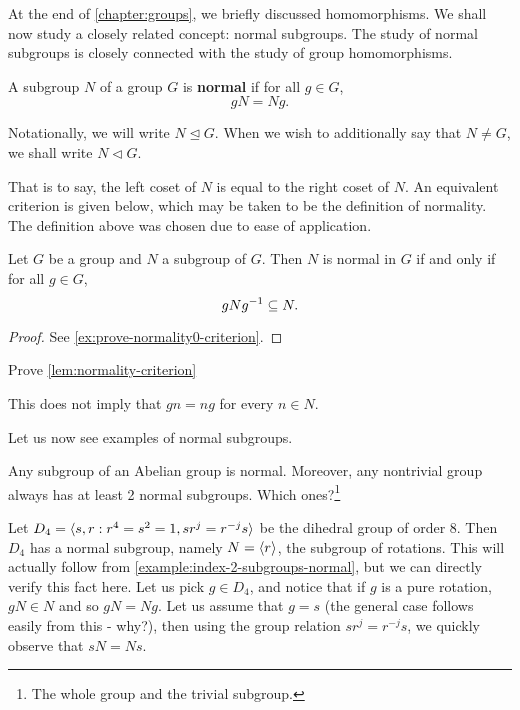 \documentclass[./main.tex]{subfiles}
\begin{document}
At the end of \cref{chapter:groups}, we briefly discussed homomorphisms. We
shall now study a closely related concept: normal subgroups. The study of normal
subgroups is closely connected with the study of group homomorphisms.


\begin{definition}
\label{def:normal-subgroup}
    A subgroup $N$ of a group $G$ is \textbf{normal} if for all $g \in G$,
    \[
        gN = Ng.
    \]

    Notationally, we will write $N \unlhd G$. When we wish to additionally say
    that $N \neq G$, we shall write $N \vartriangleleft G$.
\end{definition}
That is to say, the left coset of $N$ is equal to the right coset of $N$. An
equivalent criterion is given below, which may be taken to be the definition of
normality. The definition above was chosen due to ease of application.
\begin{lemma}
\label{lem:normality-criterion}
    Let $G$ be a group and $N$ a subgroup of $G$. Then $N$ is normal in $G$ if
    and only if for all $g \in G$, 
    \[
        gNg^{-1} \subseteq N.
    \]
\end{lemma}
\begin{proof}
    See \cref{ex:prove-normality0-criterion}.
\end{proof}

\begin{exercise}
\label{ex:prove-normality0-criterion}
    Prove \cref{lem:normality-criterion}
\end{exercise}

\begin{warning}
    This does not imply that $gn = ng$ for every $n \in N$.
\end{warning}

Let us now see examples of normal subgroups.

\begin{example}
    Any subgroup of an Abelian group is normal. Moreover, any nontrivial group
    always has at least 2 normal subgroups. Which ones?\footnote{The whole group
    and the trivial subgroup.}
\end{example}

\begin{example}
    Let $D_4 = { \langle s, r : r^4=s^2=1, sr^j = r^{-j}s \rangle }$ be the dihedral group of
    order 8. Then $D_4$ has a normal subgroup, namely $N = { \langle r \rangle }$, the
    subgroup of rotations. This will actually follow from
    \cref{example:index-2-subgroups-normal}, but we can directly verify this
    fact here. Let us pick $g \in D_4$, and notice that if $g$ is a pure
    rotation, $gN \in N$ and so $gN = Ng$. Let us assume that $g = s$ (the
    general case follows easily from this - why?), then using the group relation
    $sr^j = r^{-j}s$, we quickly observe that $sN = Ns$.
\end{example}
\end{document}
